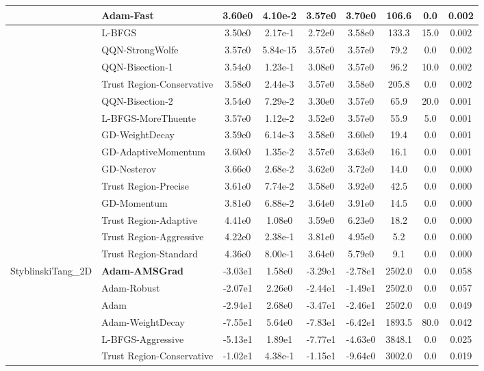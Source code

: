 \documentclass[10pt]{article}
\begin{document}
\begin{longtable}{|l|l|c|c|c|c|c|c|c|}
\hline
 & Adam-Fast & 3.60e0 & 4.10e-2 & 3.57e0 & 3.70e0 & 106.6 & 0.0 & 0.002 \\
\hline
 & L-BFGS & 3.50e0 & 2.17e-1 & 2.72e0 & 3.58e0 & 133.3 & 15.0 & 0.002 \\
\hline
 & QQN-StrongWolfe & 3.57e0 & 5.84e-15 & 3.57e0 & 3.57e0 & 79.2 & 0.0 & 0.002 \\
\hline
 & QQN-Bisection-1 & 3.54e0 & 1.23e-1 & 3.08e0 & 3.57e0 & 96.2 & 10.0 & 0.002 \\
\hline
 & Trust Region-Conservative & 3.58e0 & 2.44e-3 & 3.57e0 & 3.58e0 & 205.8 & 0.0 & 0.002 \\
\hline
 & QQN-Bisection-2 & 3.54e0 & 7.29e-2 & 3.30e0 & 3.57e0 & 65.9 & 20.0 & 0.001 \\
\hline
 & L-BFGS-MoreThuente & 3.57e0 & 1.12e-2 & 3.52e0 & 3.57e0 & 55.9 & 5.0 & 0.001 \\
\hline
 & GD-WeightDecay & 3.59e0 & 6.14e-3 & 3.58e0 & 3.60e0 & 19.4 & 0.0 & 0.001 \\
\hline
 & GD-AdaptiveMomentum & 3.60e0 & 1.35e-2 & 3.57e0 & 3.63e0 & 16.1 & 0.0 & 0.001 \\
\hline
 & GD-Nesterov & 3.66e0 & 2.68e-2 & 3.62e0 & 3.72e0 & 14.0 & 0.0 & 0.000 \\
\hline
 & Trust Region-Precise & 3.61e0 & 7.74e-2 & 3.58e0 & 3.92e0 & 42.5 & 0.0 & 0.000 \\
\hline
 & GD-Momentum & 3.81e0 & 6.88e-2 & 3.64e0 & 3.91e0 & 14.5 & 0.0 & 0.000 \\
\hline
 & Trust Region-Adaptive & 4.41e0 & 1.08e0 & 3.59e0 & 6.23e0 & 18.2 & 0.0 & 0.000 \\
\hline
 & Trust Region-Aggressive & 4.22e0 & 2.38e-1 & 3.81e0 & 4.95e0 & 5.2 & 0.0 & 0.000 \\
\hline
 & Trust Region-Standard & 4.36e0 & 8.00e-1 & 3.64e0 & 5.79e0 & 9.1 & 0.0 & 0.000 \\
StyblinskiTang\_2D & \textbf{Adam-AMSGrad} & -3.03e1 & 1.58e0 & -3.29e1 & -2.78e1 & 2502.0 & 0.0 & 0.058 \\
\hline
 & Adam-Robust & -2.07e1 & 2.26e0 & -2.44e1 & -1.49e1 & 2502.0 & 0.0 & 0.057 \\
\hline
 & Adam & -2.94e1 & 2.68e0 & -3.47e1 & -2.46e1 & 2502.0 & 0.0 & 0.049 \\
\hline
 & Adam-WeightDecay & -7.55e1 & 5.64e0 & -7.83e1 & -6.42e1 & 1893.5 & 80.0 & 0.042 \\
\hline
 & L-BFGS-Aggressive & -5.13e1 & 1.89e1 & -7.77e1 & -4.63e0 & 3848.1 & 0.0 & 0.025 \\
\hline
 & Trust Region-Conservative & -1.02e1 & 4.38e-1 & -1.15e1 & -9.64e0 & 3002.0 & 0.0 & 0.019 \\

\end{longtable}
\end{document}
